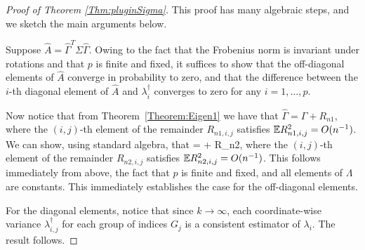 \begin{proof}[Proof of Theorem \ref{Thm:pluginSigma}]
This proof has many algebraic steps, and we sketch the main arguments below.


Suppose $\hat{A} = \widehat{{\Gamma}}^{T}  \Sigma \widehat{{\Gamma}}$.  Owing to the fact that the Frobenius norm is invariant under rotations and that $p$ is finite and fixed, it suffices to show that the off-diagonal elements of $\hat{A}$ converge in probability to zero, and that the difference between the $i$-th diagonal element of $\hat{A}$ and ${\lambda}^{\dagger}_{i}$ converges to zero for any $i = 1, \ldots, p$.

Now notice that from Theorem~\ref{Theorem:Eigen1} we have that $\widehat{{\Gamma}} 
= {{\Gamma}} + R_{n1}$, where the $(i, j)$-th element of the remainder 
$R_{n1, i, j}$ satisfies ${\mathbb{E}}  R_{n1, i, j}^{2} = O(n^{-1})$. We can show, using standard algebra, that 
\ban
{} = \Lambda + R_{n2}, 
\ean
where the $(i, j)$-th element of the remainder 
$R_{n2, i, j}$ satisfies ${\mathbb{E}}  R_{n2, i, j}^{2} = O(n^{-1})$. 
This follows immediately from above, the fact that $p$ is finite and fixed, and all 
elements of $\Lambda$ are constants. This immediately establishes the case for the 
off-diagonal elements. 

For the diagonal elements, notice that since $k \rightarrow \infty$, each 
coordinate-wise variance $\lambda_{i, j}^{\dagger}$ for each group of indices $G_j$ 
is a consistent estimator of $\lambda_{i}$. The result follows.

\end{proof}

